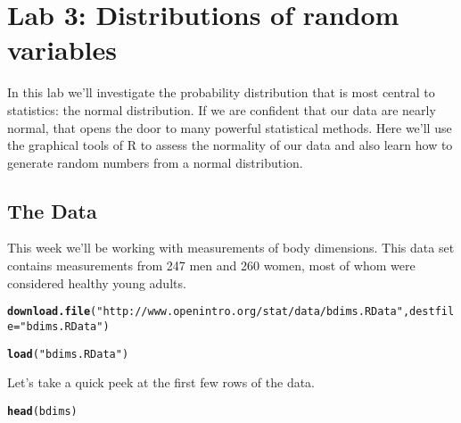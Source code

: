 \documentclass{article}\usepackage[]{graphicx}\usepackage[]{color}
\makeatletter
\newcommand{\hlstr}[1]{\textcolor[rgb]{0.192,0.494,0.8}{#1}}%
\newcommand{\hlstd}[1]{\textcolor[rgb]{0.345,0.345,0.345}{#1}}%
\newcommand{\hlkwc}[1]{\textcolor[rgb]{0.333,0.667,0.333}{#1}}%
\newcommand{\hlkwd}[1]{\textcolor[rgb]{0.737,0.353,0.396}{\textbf{#1}}}%
\newenvironment{kframe}{%
 \def\at@end@of@kframe{}%
 \ifinner\ifhmode%
  \def\at@end@of@kframe{\end{minipage}}%
  \begin{minipage}{\columnwidth}%
 \fi\fi%
 \def\FrameCommand##1{\hskip\@totalleftmargin \hskip-\fboxsep
 \colorbox{shadecolor}{##1}\hskip-\fboxsep
     \hskip-\linewidth \hskip-\@totalleftmargin \hskip\columnwidth}%
 \MakeFramed {\advance\hsize-\width
   \@totalleftmargin\z@ \linewidth\hsize
   \@setminipage}}%
 {\par\unskip\endMakeFramed%
 \at@end@of@kframe}
\newenvironment{knitrout}{}{} %
\makeatother
\begin{document}
\section*{Lab 3: Distributions of random variables} %


In this lab we'll investigate the probability distribution that is most central to statistics: the normal distribution.  If we are confident that our data are nearly normal, that opens the door to many powerful statistical methods.  Here we'll use the graphical tools of R to assess the normality of our data and also learn how to generate random numbers from a normal distribution.

\subsection*{The Data}
This week we'll be working with measurements of body dimensions.  This data set contains measurements from 247 men and 260 women, most of whom were considered healthy young adults.

\begin{knitrout}
\color{fgcolor}\begin{kframe}
\begin{alltt}
\hlkwd{download.file}\hlstd{(}\hlstr{"http://www.openintro.org/stat/data/bdims.RData"}\hlstd{,} \hlkwc{destfile} \hlstd{=} \hlstr{"bdims.RData"}\hlstd{)}

\hlkwd{load}\hlstd{(}\hlstr{"bdims.RData"}\hlstd{)}
\end{alltt}
\end{kframe}
\end{knitrout}


Let's take a quick peek at the first few rows of the data.

\begin{knitrout}
\color{fgcolor}\begin{kframe}
\begin{alltt}
\hlkwd{head}\hlstd{(bdims)}
\end{alltt}
\end{kframe}
\end{knitrout}
\end{document}
